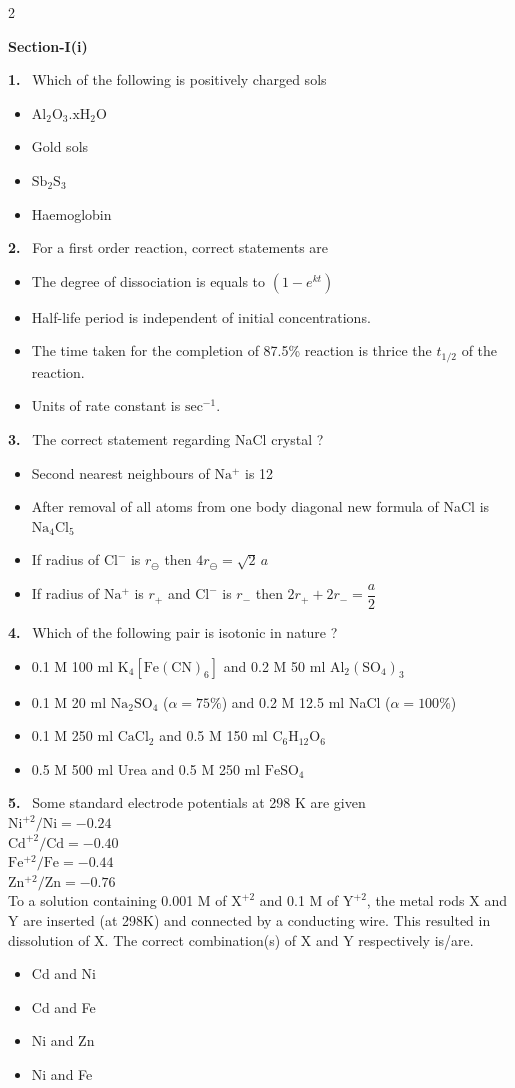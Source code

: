 \documentclass[10pt]{extarticle}
\newcommand{\partsec}[2]{\par\medskip\noindent{\large\bfseries PART-#1: #2}\par\smallskip}
\newcommand{\sect}[1]{\par\smallskip\noindent\textbf{#1}\par}
\newcommand{\qn}[1]{\par\smallskip\noindent\textbf{#1.}~}
\newenvironment{qoptions}{\begin{itemize}[leftmargin=1.8em,itemsep=1pt,topsep=2pt,label={}]}{\end{itemize}}
\newcommand{\opt}[2]{\item[(#1)] #2}
\begin{document}
\begin{multicols}{2}
\partsec{2}{CHEMISTRY}
\sect{Section-I(i)}
\qn{1} Which of the following is positively charged sols
\begin{qoptions}
\opt{A}{$\mathrm{Al_2O_3.xH_2O}$}
\opt{B}{Gold sols}
\opt{C}{$\mathrm{Sb_2S_3}$}
\opt{D}{Haemoglobin}
\end{qoptions}
\qn{2} For a first order reaction, correct statements are
\begin{qoptions}
\opt{A}{The degree of dissociation is equals to $\left(1-e^{kt}\right)$}
\opt{B}{Half-life period is independent of initial concentrations.}
\opt{C}{The time taken for the completion of 87.5\% reaction is thrice the $t_{1/2}$ of the reaction.}
\opt{D}{Units of rate constant is $\mathrm{sec^{-1}}$.}
\end{qoptions}
\qn{3} The correct statement regarding NaCl crystal ?
\begin{qoptions}
\opt{A}{Second nearest neighbours of $\mathrm{Na^+}$ is 12}
\opt{B}{After removal of all atoms from one body diagonal new formula of NaCl is $\mathrm{Na_4Cl_5}$}
\opt{C}{If radius of $\mathrm{Cl^-}$ is $r_\ominus$ then $4r_\ominus=\sqrt2\,a$}
\opt{D}{If radius of $\mathrm{Na^+}$ is $r_+$ and $\mathrm{Cl^-}$ is $r_-$ then $2r_++2r_-=\dfrac a2$}
\end{qoptions}
\qn{4} Which of the following pair is isotonic in nature ?
\begin{qoptions}
\opt{A}{0.1 M 100 ml $\mathrm{K_4\left[Fe(CN)_6\right]}$ and 0.2 M 50 ml $\mathrm{Al_2(SO_4)_3}$}
\opt{B}{0.1 M 20 ml $\mathrm{Na_2SO_4}$ ($\alpha=75\%$) and 0.2 M 12.5 ml NaCl ($\alpha=100\%$)}
\opt{C}{0.1 M 250 ml $\mathrm{CaCl_2}$ and 0.5 M 150 ml $\mathrm{C_6H_{12}O_6}$}
\opt{D}{0.5 M 500 ml Urea and 0.5 M 250 ml $\mathrm{FeSO_4}$}
\end{qoptions}
\qn{5} Some standard electrode potentials at 298 K are given\\
$\mathrm{Ni^{+2}/Ni}=-0.24$\\
$\mathrm{Cd^{+2}/Cd}=-0.40$\\
$\mathrm{Fe^{+2}/Fe}=-0.44$\\
$\mathrm{Zn^{+2}/Zn}=-0.76$\\
To a solution containing 0.001 M of $\mathrm{X^{+2}}$ and 0.1 M of $\mathrm{Y^{+2}}$, the metal rods X and Y are inserted (at 298K) and connected by a conducting wire. This resulted in dissolution of X. The correct combination(s) of X and Y respectively is/are.
\begin{qoptions}
\opt{A}{Cd and Ni}
\opt{B}{Cd and Fe}
\opt{C}{Ni and Zn}
\opt{D}{Ni and Fe}
\end{qoptions}

\end{multicols}
\end{document}
